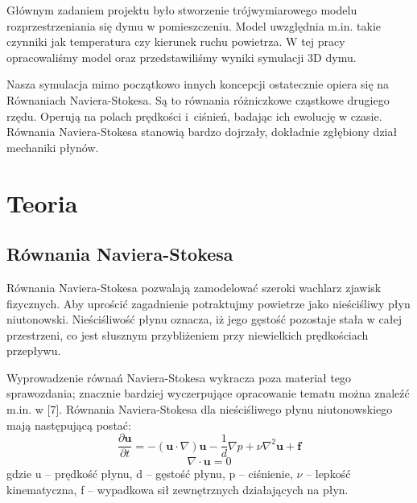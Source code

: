 \documentclass{article}
\begin{document}
	\medskip
	\medskip
	\noindent Głównym zadaniem projektu było stworzenie trójwymiarowego modelu rozprzestrzeniania się dymu w pomieszczeniu. Model uwzględnia m.in. takie czynniki jak temperatura czy kierunek ruchu powietrza. W tej pracy opracowaliśmy model oraz przedstawiliśmy wyniki symulacji 3D dymu.
	
	\medskip
	\medskip
	\noindent Nasza symulacja mimo początkowo innych koncepcji ostatecznie opiera się na Równaniach Naviera-Stokesa. Są to równania różniczkowe cząstkowe drugiego rzędu. Operują na polach prędkości i~ciśnień, badając ich ewolucję w czasie. Równania Naviera-Stokesa stanowią bardzo dojrzały, dokładnie zgłębiony dział mechaniki płynów.
	
	\vspace{12mm}
	\section{Teoria}
	\vspace{3mm}
	\subsection{Równania Naviera-Stokesa}
	Równania Naviera-Stokesa pozwalają zamodelować szeroki wachlarz zjawisk fizycznych. Aby uprościć zagadnienie potraktujmy powietrze jako nieściśliwy płyn niutonowski. Nieściśliwość płynu oznacza, iż jego gęstość pozostaje stała w całej przestrzeni, co jest słusznym przybliżeniem przy niewielkich prędkościach przepływu.
	
	\medskip
	\medskip
	\noindent Wyprowadzenie równań Naviera-Stokesa wykracza poza materiał tego sprawozdania; znacznie bardziej wyczerpujące opracowanie tematu można znaleźć m.in. w [7]. Równania Naviera-Stokesa dla nieściśliwego płynu niutonowskiego mają następującą postać:
	$$
	\frac{\partial \mathbf{u}}{\partial t} =-(\mathbf{u} \cdot \nabla) \mathbf{u}-\frac{1}{d} \nabla p+\nu \nabla^{2} \mathbf{u}+\mathbf{f} 
	$$
	$$
	\nabla \cdot \mathbf{u} =0
	$$
	gdzie u – prędkość płynu, d – gęstość płynu, p – ciśnienie, $\nu$ – lepkość kinematyczna, f – wypadkowa sił zewnętrznych działających na płyn.
	
\end{document}

